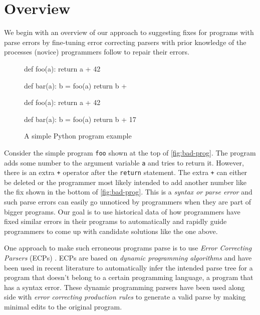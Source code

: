 \section{Overview}
\label{sec:overview}

We begin with an overview of our approach to suggesting fixes for programs with
parse errors by fine-tuning error correcting parsers with prior knowledge of the
processes (novice) programmers follow to repair their errors.

\begin{figure}[h]
\centering
\begin{minipage}[c]{0.48\linewidth}
\begin{ecode}
def foo(a):
  return a + 42

def bar(a):
  b = foo(a)
  return b +
\end{ecode}
\label{fig:bad-prog}
\end{minipage}%
\hspace{0.02\linewidth}%
\begin{minipage}[c]{0.48\linewidth}
\begin{ecode}
def foo(a):
  return a + 42

def bar(a):
  b = foo(a)
  return b + 17
\end{ecode}
\label{fig:fixed-prog}
\end{minipage}
\caption{A simple Python program example}
\end{figure}


 Consider the simple program \texttt{foo} shown at the top
of \autoref{fig:bad-prog}. The program adds some number to the argument
variable \texttt{a} and tries to return it. However, there is an extra
\texttt{+} operator after the \texttt{return} statement. The extra \texttt{+}
can either be deleted or the programmer most likely intended to add another
number like the fix shown in the bottom of \autoref{fig:bad-prog}. This is a
\emph{syntax or parse error} and such parse errors can easily go unnoticed
\citep{Denny_2012, Ahadi_2018, VanDerSpek_2005} by programmers when they are
part of bigger programs.
%
Our goal is to use historical data of how programmers have fixed similar errors
in their programs to automatically and rapidly guide programmers to come up with
candidate solutions like the one above.


One approach to make such erroneous programs parse is to use \emph{Error
Correcting Parsers} (ECPs) \citep{Aho_1972}. ECPs are based on \emph{dynamic
programming algorithms} and have been used in recent literature to automatically
infer the intended parse tree for a program that doesn't belong to a certain
programming language, \ie a program that has a syntax error. These dynamic
programming parsers have been used along side with \emph{error correcting
production rules} \citep{Aho_1972} to generate a valid parse by making minimal
edits to the original program.

